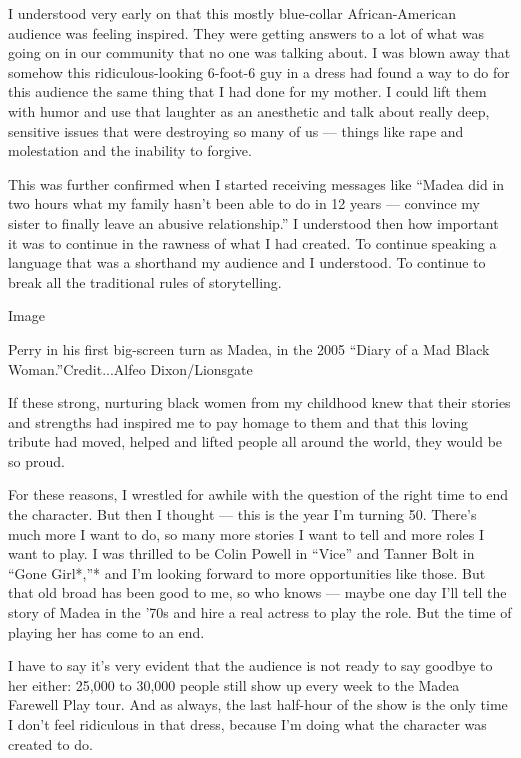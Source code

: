 I understood very early on that this mostly blue-collar African-American
audience was feeling inspired. They were getting answers to a lot of
what was going on in our community that no one was talking about. I was
blown away that somehow this ridiculous-looking 6-foot-6 guy in a dress
had found a way to do for this audience the same thing that I had done
for my mother. I could lift them with humor and use that laughter as an
anesthetic and talk about really deep, sensitive issues that were
destroying so many of us --- things like rape and molestation and the
inability to forgive.

This was further confirmed when I started receiving messages like
``Madea did in two hours what my family hasn't been able to do in 12
years --- convince my sister to finally leave an abusive relationship.''
I understood then how important it was to continue in the rawness of
what I had created. To continue speaking a language that was a shorthand
my audience and I understood. To continue to break all the traditional
rules of storytelling.

Image

Perry in his first big-screen turn as Madea, in the 2005 ``Diary of a
Mad Black Woman.''Credit...Alfeo Dixon/Lionsgate

If these strong, nurturing black women from my childhood knew that their
stories and strengths had inspired me to pay homage to them and that
this loving tribute had moved, helped and lifted people all around the
world, they would be so proud.

For these reasons, I wrestled for awhile with the question of the right
time to end the character. But then I thought --- this is the year I'm
turning 50. There's much more I want to do, so many more stories I want
to tell and more roles I want to play. I was thrilled to be Colin Powell
in ``Vice'' and Tanner Bolt in ``Gone Girl*,''* and I'm looking forward
to more opportunities like those. But that old broad has been good to
me, so who knows --- maybe one day I'll tell the story of Madea in the
'70s and hire a real actress to play the role. But the time of playing
her has come to an end.

I have to say it's very evident that the audience is not ready to say
goodbye to her either: 25,000 to 30,000 people still show up every week
to the Madea Farewell Play tour. And as always, the last half-hour of
the show is the only time I don't feel ridiculous in that dress, because
I'm doing what the character was created to do.

